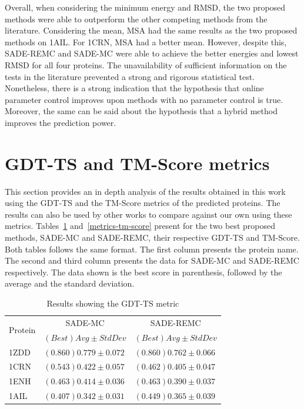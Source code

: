 Overall, when considering the minimum energy and \ac{RMSD}, the two proposed methods were able to outperform the other competing methods from the literature.
Considering the mean, MSA had the same results as the two proposed methods on 1AIL. For 1CRN, MSA
had a better mean. However, despite this, SADE-REMC and SADE-MC were able to achieve the better energies
and lowest \ac{RMSD} for all four proteins.
The unavailability of sufficient information on the tests in the literature
prevented a strong and rigorous statistical test. Nonetheless, there is a strong indication that
the hypothesis that online parameter control improves upon methods with no parameter control is true.
Moreover, the same can be said about the hypothesis that a hybrid method improves the prediction
power.


\section{GDT-TS and TM-Score metrics}


This section provides an in depth analysis of the results obtained in this work using the GDT-TS and the TM-Score metrics of the predicted proteins. The results can also be used by other works to compare against our own using these metrics. Tables~\ref{metrics-gdt-ts} and~\ref{metrics-tm-score} present for the two best proposed methods, SADE-MC and SADE-REMC, their respective GDT-TS and TM-Score. Both tables follows the same format. The first column presents the protein name. The second and third column
presents the data for SADE-MC and SADE-REMC respectively. The data shown is the
best score in parenthesis, followed by the average and the standard deviation.

\begin{table}[ht!]
  \centering
  \begin{tabular}{ l | l | l }
    \hline \hline
\multirow{2}{*}{Protein}& \multicolumn{1}{c|}{SADE-MC}      & \multicolumn{1}{c}{SADE-REMC}       \\ \cline{2-3}
                        & $(Best) Avg \pm Std Dev $ & $(Best) Avg \pm Std Dev$  \\ \hline \hline
\multirow{1}{*}{1ZDD}   & $(0.860) 0.779 \pm 0.072$ & $(0.860) 0.762 \pm 0.066$ \\ \hline
\multirow{1}{*}{1CRN}   & $(0.543) 0.422 \pm 0.057$ & $(0.462) 0.405 \pm 0.047$ \\ \hline
\multirow{1}{*}{1ENH}   & $(0.463) 0.414 \pm 0.036$ & $(0.463) 0.390 \pm 0.037$ \\ \hline
\multirow{1}{*}{1AIL}   & $(0.407) 0.342 \pm 0.031$ & $(0.449) 0.365 \pm 0.039$ \\ \hline
    \hline \hline
  \end{tabular}
  \caption{Results showing the GDT-TS metric}
  \label{metrics-gdt-ts}
\end{table}

